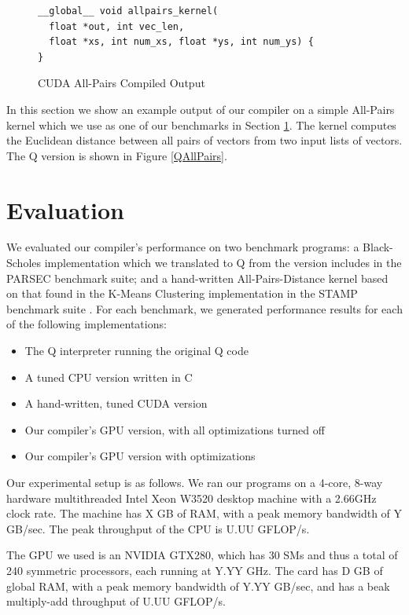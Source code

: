 \documentclass[preprint]{sigplanconf}
\begin{document}
\begin{figure}
\begin{verbatim}
__global__ void allpairs_kernel(
  float *out, int vec_len,
  float *xs, int num_xs, float *ys, int num_ys) {
}
\end{verbatim}
\caption{CUDA All-Pairs Compiled Output}
\label{CUDAAllPairs}
\end{figure}

In this section we show an example output of our compiler on a simple All-Pairs kernel which we use as one of our benchmarks in Section \ref{Evaluation}.  The kernel computes the Euclidean distance between all pairs of vectors from two input lists of vectors.  The Q version is shown in Figure \ref{QAllPairs}.


\section{Evaluation}
\label{Evaluation}

We evaluated our compiler's performance on two benchmark programs: a Black-Scholes implementation which we translated to Q from the version includes in the PARSEC \cite{Bien08} benchmark suite; and a hand-written All-Pairs-Distance kernel based on that found in the K-Means Clustering implementation in the STAMP benchmark suite \cite{Minh08}.  For each benchmark, we generated performance results for each of the following implementations:

\begin{itemize}
\item The Q interpreter running the original Q code
\item A tuned CPU version written in C
\item A hand-written, tuned CUDA version
\item Our compiler's GPU version, with all optimizations turned off
\item Our compiler's GPU version with optimizations
\end{itemize}

Our experimental setup is as follows.  We ran our programs on a 4-core, 8-way hardware multithreaded Intel Xeon W3520 desktop machine with a 2.66GHz clock rate.  The machine has X GB of RAM, with a peak memory bandwidth of Y GB/sec.  The peak throughput of the CPU is U.UU GFLOP/s.

The GPU we used is an NVIDIA GTX280, which has 30 SMs and thus a total of 240 symmetric processors, each running at Y.YY GHz.  The card has D GB of global RAM, with a peak memory bandwidth of Y.YY GB/sec, and has a beak multiply-add throughput of U.UU GFLOP/s.
\end{document}
